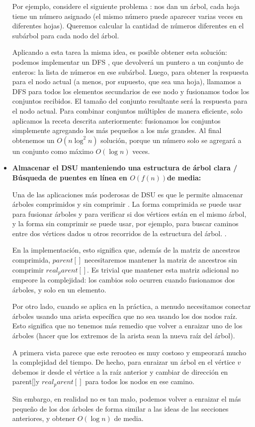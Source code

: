 \begin{itemize}
	 Por ejemplo, considere el siguiente problema : nos dan un árbol, cada hoja tiene un número asignado (el mismo número puede aparecer varias veces en diferentes hojas). Queremos calcular la cantidad de números diferentes en el subárbol para cada nodo del árbol.
	 
	 Aplicando a esta tarea la misma idea, es posible obtener esta solución: podemos implementar un DFS , que devolverá un puntero a un conjunto de enteros: la lista de números en ese subárbol. Luego, para obtener la respuesta para el nodo actual (a menos, por supuesto, que sea una hoja), llamamos a DFS para todos los elementos secundarios de ese nodo y fusionamos todos los conjuntos recibidos. El tamaño del conjunto resultante será la respuesta para el nodo actual. Para combinar conjuntos múltiples de manera eficiente, solo aplicamos la receta descrita anteriormente: fusionamos los conjuntos simplemente agregando los más pequeños a los más grandes. Al final obtenemos un $O(n \log^2 n)$ solución, porque un número solo se agregará a un conjunto como máximo $O(\log n)$ veces.
	 
	 \item \textbf{Almacenar el DSU manteniendo una estructura de árbol clara / Búsqueda de puentes en línea en $O(f(n))$de media:}
	 
	 Una de las aplicaciones más poderosas de DSU es que le permite almacenar árboles comprimidos y sin comprimir . La forma comprimida se puede usar para fusionar árboles y para verificar si dos vértices están en el mismo árbol, y la forma sin comprimir se puede usar, por ejemplo, para buscar caminos entre dos vértices dados u otros recorridos de la estructura del árbol. .
	 
	 En la implementación, esto significa que, además de la matriz de ancestros comprimida, $parent[]$ necesitaremos mantener la matriz de ancestros sin comprimir $real_parent[]$. Es trivial que mantener esta matriz adicional no empeore la complejidad: los cambios solo ocurren cuando fusionamos dos árboles, y solo en un elemento.
	 
	 Por otro lado, cuando se aplica en la práctica, a menudo necesitamos conectar árboles usando una arista específica que no sea usando los dos nodos raíz. Esto significa que no tenemos más remedio que volver a enraizar uno de los árboles (hacer que los extremos de la arista sean la nueva raíz del árbol).
	 
	 A primera vista parece que este rerooteo es muy costoso y empeorará mucho la complejidad del tiempo. De hecho, para enraizar un árbol en el vértice $v$ debemos ir desde el vértice a la raíz anterior y cambiar de dirección en parent[]y $real_parent[]$ para todos los nodos en ese camino.
	 
	 Sin embargo, en realidad no es tan malo, podemos volver a enraizar el más pequeño de los dos árboles de forma similar a las ideas de las secciones anteriores, y obtener $O(\log n)$ de media.
\end{itemize}
